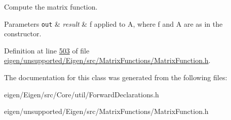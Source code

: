 Compute the matrix function. 


\begin{DoxyParams}[1]{Parameters}
\mbox{\tt out}  & {\em result} & {\ttfamily f} applied to {\ttfamily A}, where {\ttfamily f} and {\ttfamily A} are as in the constructor. \\
\hline
\end{DoxyParams}


Definition at line \hyperlink{eigen_2unsupported_2_eigen_2src_2_matrix_functions_2_matrix_function_8h_source_l00503}{503} of file \hyperlink{eigen_2unsupported_2_eigen_2src_2_matrix_functions_2_matrix_function_8h_source}{eigen/unsupported/\+Eigen/src/\+Matrix\+Functions/\+Matrix\+Function.\+h}.



The documentation for this class was generated from the following files\+:\begin{DoxyCompactItemize}
\item 
eigen/\+Eigen/src/\+Core/util/\+Forward\+Declarations.\+h\item 
eigen/unsupported/\+Eigen/src/\+Matrix\+Functions/\+Matrix\+Function.\+h\end{DoxyCompactItemize}
